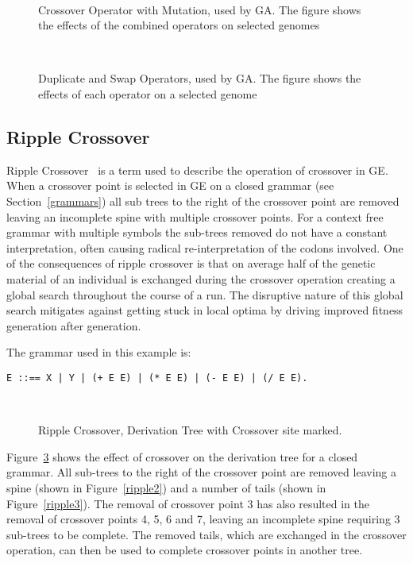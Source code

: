 \begin{figure}[]
\centerline{\hbox{
}}
\caption[Crossover Operator with Mutation]{Crossover Operator with Mutation, used by GA. The figure shows the effects of the combined operators on selected genomes}
\label{ga_operators_crossover} 
\end{figure}

\begin{figure}[]
\centerline{\hbox{
}}
\caption[Duplicate and Swap Operators]{Duplicate and Swap Operators, used by GA. The figure shows the effects of each operator on a selected genome}
\label{ga_operators_dupswap}
\end{figure}


\subsection{Ripple Crossover}
\label{ripple_crossover}Ripple Crossover~\cite{ripple} is a term used to describe the operation of crossover in GE. When a crossover point is selected in GE on a closed grammar (see Section~\ref{grammars}) all sub trees to the right of the crossover point are removed leaving an incomplete spine with multiple crossover points. For a context free grammar with multiple symbols the sub-trees removed do not have a constant interpretation, often causing radical re-interpretation of the codons involved. One of the consequences of ripple crossover is that on average half of the genetic material of an individual is exchanged during the crossover operation creating a global search throughout the course of a run. The disruptive nature of this global search mitigates against getting stuck in local optima by driving  improved fitness generation after generation. 


The grammar used in this example is:
\begin{verbatim}
E ::== X | Y | (+ E E) | (* E E) | (- E E) | (/ E E).
\end{verbatim}

\begin{figure}[]
\centerline{\hbox{
}}
\caption[Ripple Crossover Derivation Tree]{Ripple Crossover, Derivation Tree with Crossover site marked.}
\label{ripple1}
\end{figure}

Figure~\ref{ripple1} shows the effect of crossover on the derivation tree for a closed grammar. All sub-trees to the right of the crossover point are removed leaving a spine (shown in Figure~\ref{ripple2}) and a number of tails (shown in Figure~\ref{ripple3}). The removal of crossover point 3 has also resulted in the removal of crossover points 4, 5, 6 and 7, leaving an incomplete spine requiring 3 sub-trees to be complete. The removed tails, which are exchanged in the crossover operation, can then be used to complete crossover points in another tree. 




